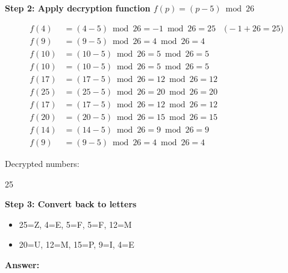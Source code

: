 \documentclass[12pt]{article}
\begin{document}
\vspace{0.3cm}

\textbf{Step 2: Apply decryption function $f(p) = (p - 5) \bmod 26$}

\begin{align*}
f(4) &= (4 - 5) \bmod 26 = -1 \bmod 26 = 25 \quad \text{(} -1 + 26 = 25\text{)} \\
f(9) &= (9 - 5) \bmod 26 = 4 \bmod 26 = 4 \\
f(10) &= (10 - 5) \bmod 26 = 5 \bmod 26 = 5 \\
f(10) &= (10 - 5) \bmod 26 = 5 \bmod 26 = 5 \\
f(17) &= (17 - 5) \bmod 26 = 12 \bmod 26 = 12 \\
f(25) &= (25 - 5) \bmod 26 = 20 \bmod 26 = 20 \\
f(17) &= (17 - 5) \bmod 26 = 12 \bmod 26 = 12 \\
f(20) &= (20 - 5) \bmod 26 = 15 \bmod 26 = 15 \\
f(14) &= (14 - 5) \bmod 26 = 9 \bmod 26 = 9 \\
f(9) &= (9 - 5) \bmod 26 = 4 \bmod 26 = 4
\end{align*}

Decrypted numbers:
\begin{center}
25         
\end{center}

\vspace{0.3cm}

\textbf{Step 3: Convert back to letters}

\begin{itemize}[leftmargin=*]
\item 25=Z, 4=E, 5=F, 5=F, 12=M
\item 20=U, 12=M, 15=P, 9=I, 4=E
\end{itemize}

\vspace{0.3cm}
\noindent\textbf{Answer:} 

\vspace{0.5cm}
\end{document}
